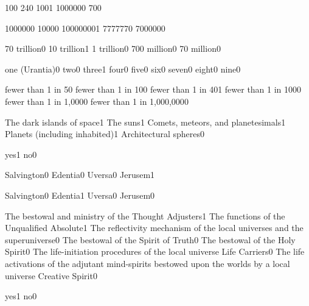 {10}{0}
{24}{0}
{100}{1}
{100000}{0}
{70}{0}
\qstop

{100000}{0}
{1000}{0}
{10000000}{1}
{777777}{0}
{700000}{0}
\qstop

{70 trillion}{0}
{10 trillion}{1}
{1 trillion}{0}
{700 million}{0}
{70 million}{0}
\qstop

{one (Urantia)}{0}
{two}{0}
{three}{1}
{four}{0}
{five}{0}
{six}{0}
{seven}{0}
{eight}{0}
{nine}{0}
\qstop

{fewer than 1 in 5}{0}
{fewer than 1 in 10}{0}
{fewer than 1 in 40}{1}
{fewer than 1 in 100}{0}
{fewer than 1 in 1,000}{0}
{fewer than 1 in 1,000,000}{0}
\qstop

{The dark islands of space}{1}
{The suns}{1}
{Comets, meteors, and planetesimals}{1}
{Planets (including inhabited)}{1}
{Architectural spheres}{0}
\qstop

{yes}{1}
{no}{0}
\qstop

{Salvington}{0}
{Edentia}{0}
{Uversa}{0}
{Jerusem}{1}
\qstop

{Salvington}{0}
{Edentia}{1}
{Uversa}{0}
{Jerusem}{0}
\qstop


{The bestowal and ministry of the Thought Adjusters}{1}
{The functions of the Unqualified Absolute}{1}
{The reflectivity mechanism of the local universes and the superuniverse}{0}
{The bestowal of the Spirit of Truth}{0}
{The bestowal of the Holy Spirit}{0}
{The life-initiation procedures of the local universe Life Carriers}{0}
{The life activations of the adjutant mind-spirits bestowed upon the worlds by a local universe Creative Spirit}{0}
\qstop

{yes}{1}
{no}{0}
\qstop

